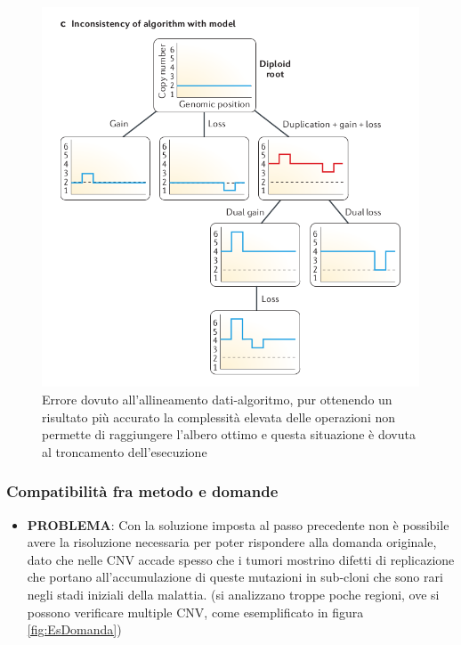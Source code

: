 \documentclass[a4paper]{article}
\begin{document}
	
	\begin{figure}[H]
	  \centering
	  \includegraphics[scale=0.30, keepaspectratio]{EsAlgoritmo.png}%
	  \captionsetup{justification=centering,margin=0.5cm}
	  \caption{Errore dovuto all'allineamento dati-algoritmo, pur ottenendo un risultato più accurato la complessità elevata 
	delle operazioni non permette di raggiungere l'albero ottimo e questa situazione è dovuta al troncamento dell'esecuzione} \label{fig:EsAlgoritmo}
	\end{figure}

	\subsubsection{Compatibilità fra metodo e domande}
	
	\begin{itemize}
	\item \textbf{PROBLEMA}: Con la soluzione imposta al passo precedente non è possibile avere la risoluzione necessaria
	per poter rispondere alla domanda originale, dato che nelle CNV accade spesso che i tumori mostrino
	difetti di replicazione che portano all'accumulazione di queste mutazioni in sub-cloni che sono rari negli
	stadi iniziali della malattia. (si analizzano troppe poche regioni, ove si possono verificare multiple CNV, come
	esemplificato in figura \ref{fig:EsDomanda})
	\end{itemize}
\end{document}
